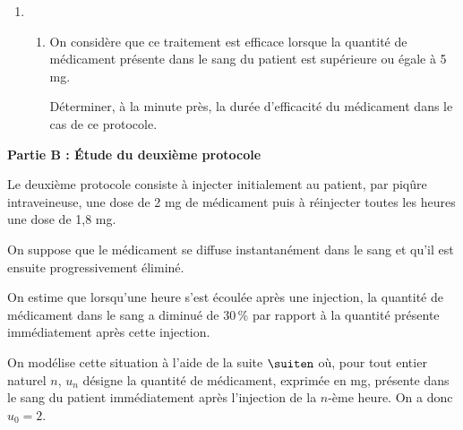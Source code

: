 \begin{enumerate}
	\item[]
	\begin{enumerate}[resume=mylist]
		\item On considère que ce traitement est efficace lorsque la quantité de médicament présente dans le sang du patient est supérieure ou égale à 5 mg.
		
		Déterminer, à la minute près, la durée d’efficacité du médicament dans le cas de ce protocole. 
	\end{enumerate}
\end{enumerate}

\textbf{Partie B : Étude du deuxième protocole}

\medskip

Le deuxième protocole consiste à injecter initialement au patient, par piqûre intraveineuse, une dose de 2 mg de médicament puis à réinjecter toutes les heures une dose de 1,8 mg. 

On suppose que le médicament se diffuse instantanément dans le sang et qu’il est ensuite progressivement éliminé.

On estime que lorsqu'une heure s’est écoulée après une injection, la quantité de médicament dans le sang a diminué de 30\,\% par rapport à la quantité présente immédiatement après cette injection.

On modélise cette situation à l’aide de la suite $\suiten$ où, pour tout entier naturel $n$, $u_n$ désigne la quantité de médicament, exprimée en mg, présente dans le sang du patient immédiatement après l’injection de la $n$-ème heure. On a donc $u_0 = 2$.

